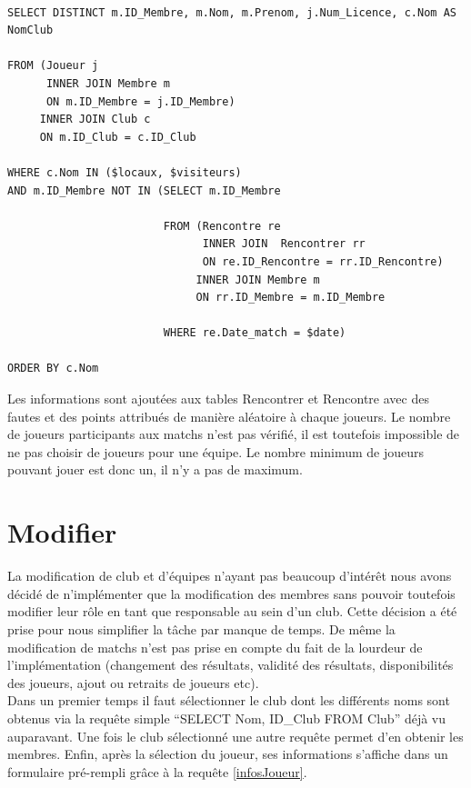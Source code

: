 \documentclass[a4paper»,8pt,french,fleqn]{report}
\begin{document}
\begin{lstlisting}

SELECT DISTINCT m.ID_Membre, m.Nom, m.Prenom, j.Num_Licence, c.Nom AS NomClub 

FROM (Joueur j 
      INNER JOIN Membre m
      ON m.ID_Membre = j.ID_Membre)
     INNER JOIN Club c
     ON m.ID_Club = c.ID_Club

WHERE c.Nom IN ($locaux, $visiteurs)
AND m.ID_Membre NOT IN (SELECT m.ID_Membre

                        FROM (Rencontre re
                              INNER JOIN  Rencontrer rr
                              ON re.ID_Rencontre = rr.ID_Rencontre)
                             INNER JOIN Membre m
                             ON rr.ID_Membre = m.ID_Membre

                        WHERE re.Date_match = $date)

ORDER BY c.Nom

\end{lstlisting}  

Les informations sont ajoutées aux tables Rencontrer et Rencontre avec des fautes et des points attribués de manière aléatoire à chaque joueurs. Le nombre de joueurs participants aux matchs n'est pas vérifié, il est toutefois impossible de ne pas choisir de joueurs pour une équipe. Le nombre minimum de joueurs pouvant jouer est donc un, il n'y a pas de maximum.

\section{Modifier}

La modification de club et d'équipes n'ayant pas beaucoup d'intérêt nous avons décidé de n'implémenter que la modification des membres sans pouvoir toutefois modifier leur rôle en tant que responsable au sein d'un club. Cette décision a été prise pour nous simplifier la tâche par manque de temps. De même la modification de matchs n'est pas prise en compte du fait de la lourdeur de l'implémentation (changement des résultats, validité des résultats, disponibilités des joueurs, ajout ou retraits de joueurs etc). \\

Dans un premier temps il faut sélectionner le club dont les différents noms sont obtenus via la requête simple ``SELECT Nom, ID\_Club FROM Club'' déjà vu auparavant. Une fois le club sélectionné une autre requête permet d'en obtenir les membres. Enfin, après la sélection du joueur, ses informations s'affiche dans un formulaire pré-rempli grâce à la requête \ref{infosJoueur}.
\end{document}
